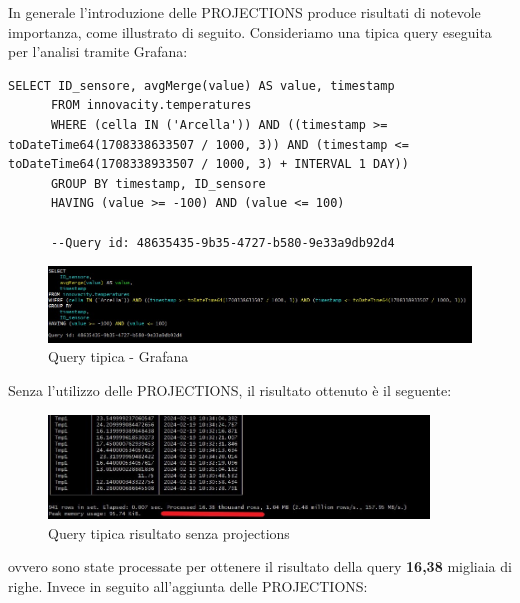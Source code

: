 In generale l'introduzione delle PROJECTIONS produce risultati di notevole importanza, come illustrato di seguito. Consideriamo una tipica query eseguita per l'analisi tramite Grafana:
    
    \begin{lstlisting}[caption={Query tipica - Grafana}, captionpos=b]
      SELECT ID_sensore, avgMerge(value) AS value, timestamp
      FROM innovacity.temperatures
      WHERE (cella IN ('Arcella')) AND ((timestamp >= toDateTime64(1708338633507 / 1000, 3)) AND (timestamp <= toDateTime64(1708338933507 / 1000, 3) + INTERVAL 1 DAY))
      GROUP BY timestamp, ID_sensore
      HAVING (value >= -100) AND (value <= 100)

      --Query id: 48635435-9b35-4727-b580-9e33a9db92d4
    \end{lstlisting}

    \begin{figure}[H]
        \centering
        \includegraphics[width=1\textwidth]{../Images/SpecificaTecnica/ProjectionQuery.jpg}
        \caption{Query tipica - Grafana}
        \label{fig:ProjectionsQuery}
      \end{figure}
      Senza l'utilizzo delle PROJECTIONS, il risultato ottenuto è il seguente:
    \begin{figure}[H]
        \centering
        \includegraphics[width=0.9\textwidth]{../Images/SpecificaTecnica/SenzaProectionResult.jpg}
        \caption{Query tipica risultato senza projections}
        \label{fig:ProjectionsQueryWthout}
      \end{figure}
      ovvero sono state processate per ottenere il risultato della query \textbf{16,38} migliaia di righe. Invece in seguito all’aggiunta delle PROJECTIONS:

